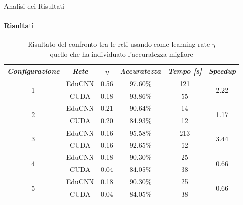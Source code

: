 \documentclass[
 ]{beamer}
\begin{document}
\begin{frame}{Analisi dei Risultati}
    \framesubtitle{Risultati}

        \begin{table}
            \centering
            \renewcommand\arraystretch{1.3}
            \setlength{\abovecaptionskip}{0pt}
            \small
            \begin{tabular}{| c | c | c | c | c | c |}
                \hline
                \emph{Configurazione} & \emph{Rete} & $\eta$ & \emph{Accuratezza} & \emph{Tempo [s]} & \emph{Speedup} \\
                \hline
                \multirow{2}{*}{1} & EduCNN & 0.56 & 97.60\% & 121 & \multirow{2}{*}{2.22} \\ \cline{2-5} 
                                   & CUDA   & 0.18 & 93.86\% & 55 & \\                               
                \hline
                \multirow{2}{*}{2} & EduCNN & 0.21 & 90.64\% & 14 & \multirow{2}{*}{1.17} \\ \cline{2-5}
                                   & CUDA   & 0.20 & 84.93\% & 12 & \\
                \hline
                \multirow{2}{*}{3} & EduCNN & 0.16 & 95.58\% & 213 & \multirow{2}{*}{3.44} \\ \cline{2-5} 
                                   & CUDA   & 0.16 & 92.65\% & 62 & \\
                \hline
                \multirow{2}{*}{4} & EduCNN & 0.18 & 90.30\% & 25 & \multirow{2}{*}{0.66} \\ \cline{2-5}
                                   & CUDA   & 0.04 & 84.05\% & 38 & \\
                \hline
                \multirow{2}{*}{5} & EduCNN & 0.18 & 90.30\% & 25 & \multirow{2}{*}{0.66} \\ \cline{2-5}
                                   & CUDA   & 0.04 & 84.05\% & 38 & \\
                \hline                                
            \end{tabular}
            \caption            
    {Risultato del confronto tra le reti usando come learning rate $\eta$ \\ quello che ha individuato l'accuratezza migliore\endtabular}          
        \end{table}    
\end{frame}
\end{document}
